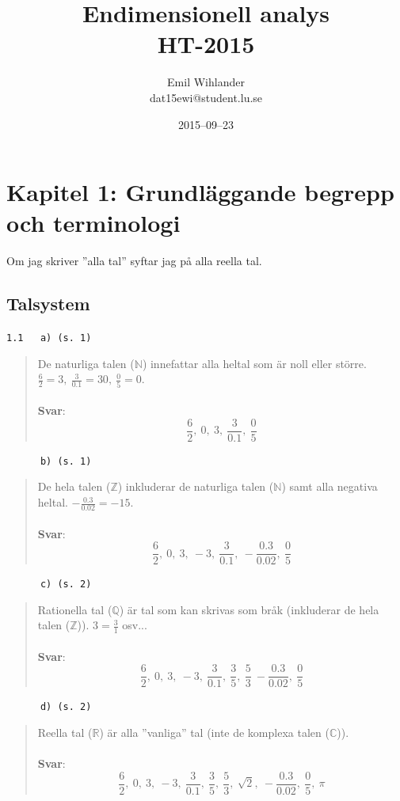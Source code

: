\documentclass[a4paper]{article}
\title{Endimensionell analys\\ HT-2015}
\author{Emil Wihlander\\ dat15ewi@student.lu.se}
\date{2015--09--23}
\newcommand{\tskcol}[1]{\textcolor{tskcol}{#1}}
\begin{document}
	\maketitle
	\pagebreak
	
	\section*{Kapitel 1: Grundläggande begrepp och terminologi}
	Om jag skriver ''alla tal'' syftar jag på alla reella tal.
	\subsection*{Talsystem}
	\texttt{\tskcol{1.1~~~a) (s. 1)}}
	\begin{quotation}
		\noindent
		De naturliga talen ($\mathbb{N}$) innefattar alla heltal som är noll eller större. $\tfrac{6}{2}=3,~\tfrac{3}{0.1}=30,~\tfrac{0}{5}=0$.
		\\ \\
		\textbf{Svar}: 
		\[\frac{6}{2},~0,~3,~\frac{3}{0.1},~\frac{0}{5}\]
	\end{quotation}
	
	\texttt{\tskcol{~~~~~~b) (s. 1)}}
	\begin{quotation}
		\noindent
		De hela talen ($\mathbb{Z}$) inkluderar de naturliga talen ($\mathbb{N}$) samt alla negativa heltal. $-\frac{0.3}{0.02}=-15$.
		\\ \\
		\textbf{Svar}: 
		\[\frac{6}{2},~0,~3,~-3,~\frac{3}{0.1},~-\frac{0.3}{0.02},~\frac{0}{5}\]
	\end{quotation}
	
	\texttt{\tskcol{~~~~~~c) (s. 2)}}
	\begin{quotation}
		\noindent
		Rationella tal ($\mathbb{Q}$) är tal som kan skrivas som bråk (inkluderar de hela talen ($\mathbb{Z}$)). $3=\frac{3}{1}$ osv...
		\\ \\
		\textbf{Svar}: 
		\[\frac{6}{2},~0,~3,~-3,~\frac{3}{0.1},~\frac{3}{5},~\frac{5}{3}~-\frac{0.3}{0.02},~\frac{0}{5}\]
	\end{quotation}

	\texttt{\tskcol{~~~~~~d) (s. 2)}}
	\begin{quotation}
		\noindent
		Reella tal ($\mathbb{R}$) är alla ''vanliga'' tal (inte de komplexa talen ($\mathbb{C}$)).
		\\ \\
		\textbf{Svar}: 
		\[\frac{6}{2},~0,~3,~-3,~\frac{3}{0.1},~\frac{3}{5},~\frac{5}{3},~\sqrt{2},~-\frac{0.3}{0.02},~\frac{0}{5},~\pi\]
	\end{quotation}
	
\end{document}
